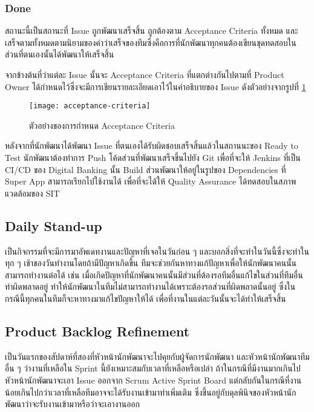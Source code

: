 \subsubsection{Done}
สถานะนี้เป็นสถานะที่ Issue ถูกพัฒนาเสร็จสิ้น ถูกต้องตาม Acceptance Criteria ทั้งหมด และเสร็จตามทั้งหมดตามนิยามของคำว่าเสร็จของทีมซึ่งคือการที่นักพัฒนาทุกคนต้องเขียนชุดทดสอบในส่วนที่ตนเองนั้นได้พัฒนาให้เสร็จสิ้น

จากข้างต้นที่ว่าแต่ละ Issue นั้นจะ Acceptance Criteria ที่แตกต่างกันไปตามที่ Product Owner ได้กำหนดไว้ซึ่งจะมีการเขียนรายละเอียดเอาไว้ในคำอธิบายของ Issue ดังตัวอย่างจากรูปที่ \ref{acceptance-criteria}
\begin{figure}[H]
    \centering
    \texttt{[image: acceptance-criteria]}
    \caption{ตัวอย่างของการกำหนด Acceptance Criteria}\label{acceptance-criteria}
\end{figure}

หลังจากที่นักพัฒนาได้พัฒนา Issue ที่ตนเองได้รับผิดชอบเสร็จสิ้นแล้วในสถานนะของ Ready to Test นักพัฒนาต้องทำการ Push โค้ดส่วนที่พัฒนาเสร็จขึ้นไปยัง Git 
เพื่อที่จะให้ Jenkins ที่เป็น CI/CD ของ Digital Banking นั้น Build ส่วนพัฒนาให้อยู่ในรูปของ Dependencies ที่ Super App สามารถเรียกไปใช้งานได้
เพื่อที่จะได้ให้ Quality Assurance ได้ทดสอบในสภาพแวดล้อมของ SIT

\subsection{Daily Stand-up}
เป็นกิจกรรมที่จะมีการมาอัพเดทงานและปัญหาที่เจอในวันก่อน ๆ และบอกสิ่งที่จะทำในวันนี้ซึ่งจะทำในทุก ๆ เช้าของวันทำงานโดยถ้ามีปัญหาเกิดขึ้น
ทีมจะช่วยกันหาทางแก้ปัญหาเพื่อให้นักพัฒนาคนนั้นสามารถทำงานต่อได้ เช่น 
เมื่อเกิดปัญหาที่นักพัฒนาคนนั้นมีส่วนที่ต้องรอทีมอื่นแก้ไขในส่วนที่ทีมอื่นทำผิดพลาดอยู่ ทำให้นักพัฒนาในทีมไม่สามารถทำงานได้เพราะต้องรอส่วนที่ผิดพลาดนั้นอยู่
ซึ่งในกรณีนี้ทุกคนในทีมก็จะหาทางมาแก้ไขปัญหาให้ได้ เพื่อที่งานในแต่ละวันนั้นจะได้ทำให้เสร็จสิ้น

\subsection{Product Backlog Refinement}
เป็นวันแรกของสัปดาห์ที่สองที่หัวหน้านักพัฒนาจะไปคุยกับผู้จัดการนักพัฒนา และหัวหน้านักพัฒนาทีมอื่น ๆ ว่างานที่เหลือใน Sprint นี้ยังเหมาะสมกับเวลาที่เหลือหรือเปล่า ถ้าในกรณีที่มีงานมากเกินไปหัวหน้านักพัฒนาจะเอา Issue ออกจาก Scrum Active Sprint Board
แต่กลับกันในกรณีที่งานน้อยเกินไปกว่าเวลาที่เหลือทีมอาจจะได้รับงานเข้ามาทำเพิ่มเติม ซึ่งขึ้นอยู่กับดุลพินิจของหัวหน้านักพัฒนาว่าจะรับงานเข้ามาหรือว่าจะเอางานออก

